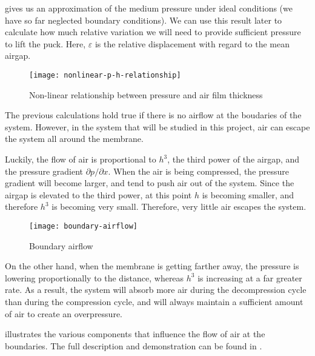  gives us an approximation of the medium pressure under ideal
conditions (we have so far neglected boundary conditions). We can use this
result later to calculate how much relative variation we will need to provide
sufficient pressure to lift the puck. Here, $\varepsilon$ is the relative
displacement with regard to the mean airgap.

\begin{figure}[h]
  \begin{center}
    \texttt{[image: nonlinear-p-h-relationship]}
  \end{center}
  \caption{Non-linear relationship between pressure and air film
  thickness\cite{wiesendanger2001}}
  \label{fig:nonlinear-relationship}
\end{figure}


The previous calculations hold true if there is no airflow at the boudaries of
the system. However, in the system that will be studied in this project, air can
escape the system all around the membrane. 

Luckily, the flow of air is proportional to $h^3$, the third power of the
airgap, and the pressure gradient $\partial p / \partial x$. When the air is
being compressed, the pressure gradient will become larger, and tend to push air
out of the system. Since the airgap is elevated to the third power, at this
point $h$ is becoming smaller, and therefore $h^3$ is becoming very small.
Therefore, very little air escapes the system.

\begin{figure}[h]
  \begin{center}
    \texttt{[image: boundary-airflow]}
  \end{center}
  \caption{Boundary airflow\cite{wiesendanger2001}}
  \label{fig:boundary-airflow}
\end{figure}

On the other hand, when the membrane is getting farther away, the pressure is
lowering proportionally to the distance, whereas $h^3$ is increasing at a far
greater rate. As a result, the system will absorb more air during the
decompression cycle than during the compression cycle, and will always maintain
a sufficient amount of air to create an overpressure.

 illustrates the various components that influence the
flow of air at the boundaries. The full description and demonstration can be
found in \cite{wiesendanger2001}.


